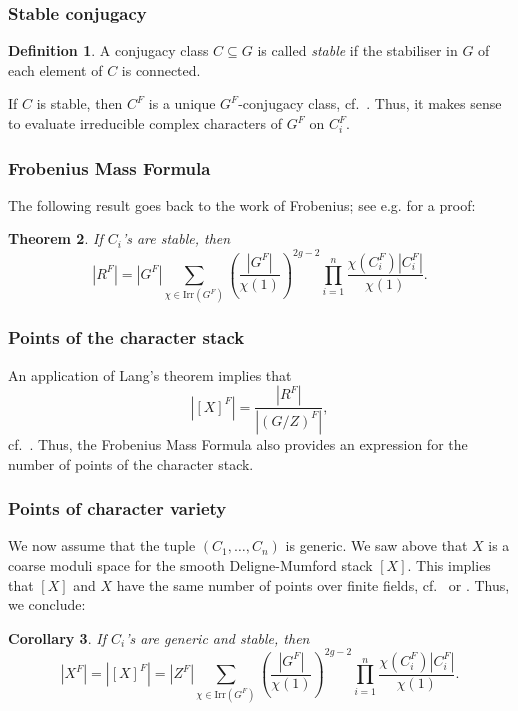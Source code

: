 \documentclass[12pt]{amsart}
\theoremstyle{plain}
\newtheorem{thm}{Theorem}
\newtheorem{cor}[thm]{Corollary}
\theoremstyle{definition}
\newtheorem{defe}[thm]{Definition}
\theoremstyle{remark}
\newcommand{\bX}{{X}}
\newcommand{\bR}{R}
\newcommand{\Irr}{\mathrm{Irr}}
\begin{document}
\subsubsection{Stable conjugacy} 

\begin{defe} A conjugacy class $C\subseteq G$ is called \emph{stable} if the stabiliser in $G$ of each element of $C$ is connected. 
\end{defe} 

If $C$ is stable, then  $C^F$ is a unique $G^F$-conjugacy class, cf.\ \cite[\S2.7.1]{GM20}. Thus, it makes sense to evaluate irreducible complex characters of $G^F$ on $C_i^F$.

\subsubsection{Frobenius Mass Formula} 
The following result goes back to the work of Frobenius; see e.g.  \cite[\S 3]{HLRV11} for a proof: 

\begin{thm} \label{t:Frob} If $C_i$'s are stable, then 
\[
{|\bR^F|} = |G^F|\sum_{\chi\in \Irr(G^F)} \left(\frac{|G^F|}{\chi(1)}\right)^{2g-2} \prod_{i=1}^n\frac{\chi(C_i^F)|C_i^F|}{\chi(1)}.
\] 
\end{thm} 


\subsubsection{Points of the character stack} An application of Lang's theorem implies that 
\[
|[\bX]^F|=\frac{|\bR^F|}{|(G/Z)^F|},
\]
cf.\ \cite[Lemma 3.5.6]{Behrend91}. 
Thus, the Frobenius Mass Formula also provides an expression for the number of points of the character stack. 


\subsubsection{Points of character variety} 
We now assume that the tuple $(C_1,\ldots,C_n)$ is generic. We saw above that $\bX$ is a coarse moduli space for the smooth Deligne-Mumford stack $[\bX]$. This implies that $[\bX]$ and $X$ have the same number of points over finite fields, cf.\ \cite[\S 2]{Behrend91} or \cite{BogaartEdixhoven}. Thus, we conclude:

\begin{cor} If $C_i$'s are generic and stable, then  
\[
|\bX^F|=|[\bX]^F| = |Z^F|\sum_{\chi\in \Irr(G^F)} \left(\frac{|G^F|}{\chi(1)}\right)^{2g-2} \prod_{i=1}^n\frac{\chi(C_i^F)|C_i^F|}{\chi(1)}.
\]
\end{cor} 
\end{document}
